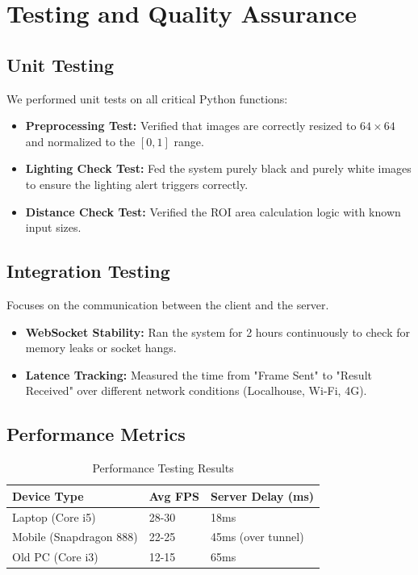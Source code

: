 \documentclass[12pt,a4paper]{report}
\begin{document}
\clearpage

\chapter{Testing and Quality Assurance}

\section{Unit Testing}
We performed unit tests on all critical Python functions:
\begin{itemize}
    \item \textbf{Preprocessing Test:} Verified that images are correctly resized to $64 \times 64$ and normalized to the $[0,1]$ range.
    \item \textbf{Lighting Check Test:} Fed the system purely black and purely white images to ensure the lighting alert triggers correctly.
    \item \textbf{Distance Check Test:} Verified the ROI area calculation logic with known input sizes.
\end{itemize}

\section{Integration Testing}
Focuses on the communication between the client and the server.
\begin{itemize}
    \item \textbf{WebSocket Stability:} Ran the system for 2 hours continuously to check for memory leaks or socket hangs.
    \item \textbf{Latence Tracking:} Measured the time from "Frame Sent" to "Result Received" over different network conditions (Localhouse, Wi-Fi, 4G).
\end{itemize}

\section{Performance Metrics}

\begin{table}[H]
\centering
\begin{tabular}{|l|l|l|}
\hline
\textbf{Device Type} & \textbf{Avg FPS} & \textbf{Server Delay (ms)} \\ \hline
Laptop (Core i5) & 28-30 & 18ms \\ \hline
Mobile (Snapdragon 888) & 22-25 & 45ms (over tunnel) \\ \hline
Old PC (Core i3) & 12-15 & 65ms \\ \hline
\end{tabular}
\caption{Performance Testing Results}
\end{table}
\end{document}
